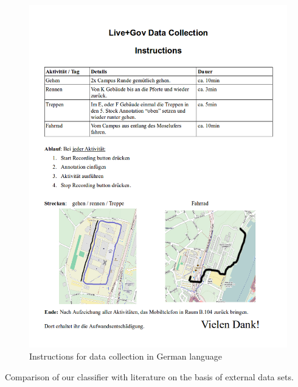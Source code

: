 \begin{figure}[htbp]
\centering
\includegraphics[width=\textwidth]{img/har/data_collection_handout.png}
\caption{Instructions for data collection in German language}\label{fig:data_collection_handout}
\end{figure}





Comparison of our classifier with literature on the basis of external
data sets.



%




